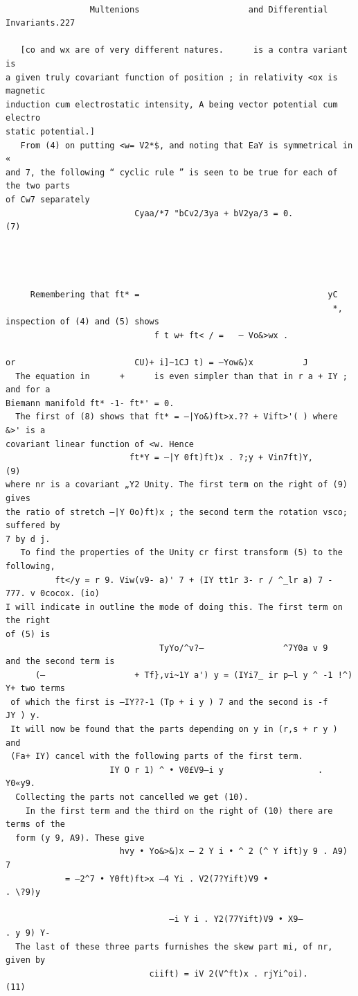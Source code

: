 \documentclass[10pt]{article}
\begin{document}
\clearpage
\begin{verbatim}

                 Multenions                      and Differential Invariants.227

   [co and wx are of very different natures.      is a contra variant          is
a given truly covariant function of position ; in relativity <ox is magnetic
induction cum electrostatic intensity, A being vector potential cum electro­
static potential.]
   From (4) on putting <w= V2*$, and noting that EaY is symmetrical in «
and 7, the following “ cyclic rule ” is seen to be true for each of the two parts
of Cw7 separately
                          Cyaa/*7 "bCv2/3ya + bV2ya/3 = 0.                    (7)




     Remembering that ft* =                                      yC
                                                                  *, inspection of (4) and (5) shows
                              f t w+ ft< / =   — Vo&>wx .

or                        CU)+ i]~1CJ t) = —Yow&)x          J
  The equation in      +      is even simpler than that in r a + IY ; and for a
Biemann manifold ft* -1- ft*' = 0.
  The first of (8) shows that ft* = —|Yo&)ft>x.?? + Vift>'( ) where &>' is a
covariant linear function of <w. Hence
                         ft*Y = —|Y 0ft)ft)x . ?;y + Vin7ft)Y,                       (9)
where nr is a covariant „Y2 Unity. The first term on the right of (9) gives
the ratio of stretch —|Y 0o)ft)x ; the second term the rotation vsco; suffered by
7 by d j.
   To find the properties of the Unity cr first transform (5) to the following,
          ft</y = r 9. Viw(v9- a)' 7 + (IY tt1r 3- r / ^_lr a) 7 - 777. v 0cocox. (io)
I will indicate in outline the mode of doing this. The first term on the right
of (5) is
                               TyYo/^v?—                ^7Y0a v 9
and the second term is
      (—                  + Tf},vi~1Y a') y = (IYi7_ ir p—l y ^ -1 !^) Y+ two terms
 of which the first is —IY??-1 (Tp + i y ) 7 and the second is -f                 JY ) y.
 It will now be found that the parts depending on y in (r,s + r y ) and
 (Fa+ IY) cancel with the following parts of the first term.
                     IY O r 1) ^ • V0£V9—i y                   . Y0«y9.
  Collecting the parts not cancelled we get (10).
    In the first term and the third on the right of (10) there are terms of the
  form (y 9, A9). These give
                       hvy • Yo&>&)x — 2 Y i • ^ 2 (^ Y ift)y 9 . A9) 7
            = —2^7 • Y0ft)ft>x —4 Yi . V2(7?Yift)V9 •                   . \?9)y

                                 —i Y i . Y2(77Yift)V9 • X9—            . y 9) Y-
  The last of these three parts furnishes the skew part mi, of nr, given by
                             ciift) = iV 2(V^ft)x . rjYi^oi).                      (11)


\end{verbatim}
\end{document}
